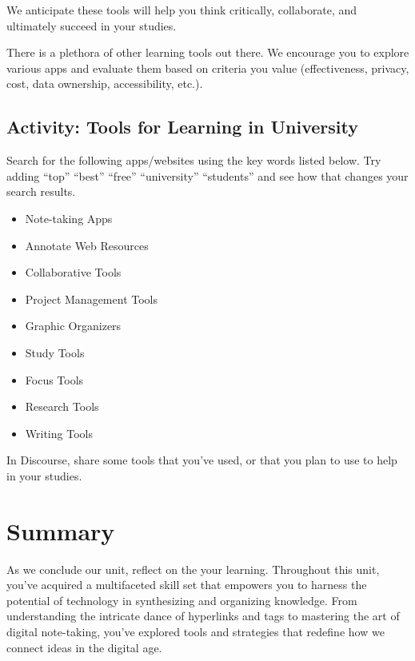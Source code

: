 \documentclass[
]{book}
\providecommand{\tightlist}{%
  \setlength{\itemsep}{0pt}\setlength{\parskip}{0pt}}
\theoremstyle{definition}
\theoremstyle{definition}
\theoremstyle{definition}
\theoremstyle{definition}
\theoremstyle{remark}
\begin{document}
We anticipate these tools will help you think critically, collaborate, and ultimately succeed in your studies.

There is a plethora of other learning tools out there. We encourage you to explore various apps and evaluate them based on criteria you value (effectiveness, privacy, cost, data ownership, accessibility, etc.).

\hypertarget{activity-tools-for-learning-in-university}{%
\subsection*{Activity: Tools for Learning in University}\label{activity-tools-for-learning-in-university}}

\begin{reflect}
Search for the following apps/websites using the key words listed below. Try adding ``top'' ``best'' ``free'' ``university'' ``students'' and see how that changes your search results.

\begin{itemize}
\tightlist
\item
  Note-taking Apps
\item
  Annotate Web Resources
\item
  Collaborative Tools
\item
  Project Management Tools
\item
  Graphic Organizers
\item
  Study Tools
\item
  Focus Tools
\item
  Research Tools
\item
  Writing Tools
\end{itemize}

In Discourse, share some tools that you've used, or that you plan to use to help in your studies.
\end{reflect}

\hypertarget{summary-2}{%
\section*{Summary}\label{summary-2}}

As we conclude our unit, reflect on the your learning. Throughout this unit, you've acquired a multifaceted skill set that empowers you to harness the potential of technology in synthesizing and organizing knowledge. From understanding the intricate dance of hyperlinks and tags to mastering the art of digital note-taking, you've explored tools and strategies that redefine how we connect ideas in the digital age.
\end{document}
